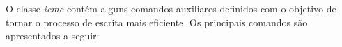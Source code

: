 

O classe \textit{icmc} contém alguns comandos auxiliares definidos com o objetivo de tornar o processo de escrita mais eficiente. Os principais comandos são apresentados a seguir:

\begin{description}
    
    \item[]
    \item[]
    \item[]
    \item[]
    \item[]
    \item[]
    \item[]
    \item[]
    \item[]
    \item[]
    
\end{description}